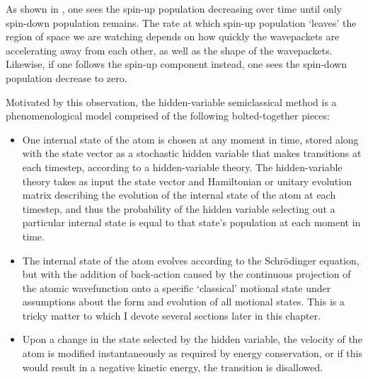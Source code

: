 As shown in , one sees the spin-up population decreasing over time until only spin-down population remains. The rate at which spin-up population `leaves' the region of space we are watching depends on how quickly the wavepackets are accelerating away from each other, as well as the shape of the wavepackets. Likewise, if one follows the spin-up component instead, one sees the spin-down population decrease to zero.

Motivated by this observation, the hidden-variable semiclassical method is a phenomenological model comprised of the following bolted-together pieces:
\begin{itemize}
\item{One internal state of the atom is chosen at any moment in time, stored along with the state vector as a stochastic hidden variable that makes transitions at each timestep, according to a hidden-variable theory. The hidden-variable theory takes as input the state vector and Hamiltonian or unitary evolution matrix describing the evolution of the internal state of the atom at each timestep, and thus the probability of the hidden variable selecting out a particular internal state is equal to that state's population at each moment in time.}
\item{The internal state of the atom evolves according to the Schr\"odinger equation, but with the addition of back-action caused by the continuous projection of the atomic wavefunction onto a specific `classical' motional state under assumptions about the form and evolution of all motional states. This is a tricky matter to which I devote several sections later in this chapter.}
\item{Upon a change in the state selected by the hidden variable, the velocity of the atom is modified instantaneously as required by energy conservation, or if this would result in a negative kinetic energy, the transition is disallowed.}
\end{itemize}


